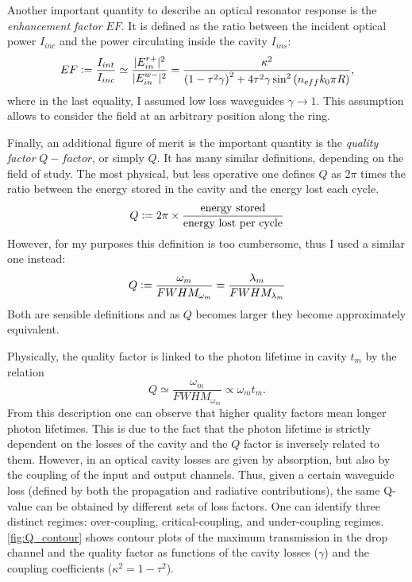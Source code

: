 Another important quantity to describe an optical resonator response is the \textit{enhancement factor} $EF$.
It is defined as the ratio between the incident optical power $I_{inc}$ and the power circulating inside the cavity $I_{ins}$:
\begin{equation}
EF
	\vcentcolon= \dfrac{I_{int}}{I_{inc}}
	\simeq \dfrac{|E_{in}^{r+}|^2}{|E_{in}^{w-}|^2}
	= \dfrac	{ \kappa^2 } { \left( 1-\tau^2	\gamma \right)^2 + 4 \tau^2	\gamma \sin^2 \left( n_{eff} k_0 \pi R \right) },
	\label{eq:enhancement_factor}
\end{equation}
where in the last equality, I assumed low loss waveguides $\gamma \rightarrow 1$.
This assumption allows to consider the field at an arbitrary position along the ring.

Finally, an additional figure of merit is the important quantity is the \textit{quality factor} $Q-factor$, or simply $Q$.
It has many similar definitions, depending on the field of study.
The most physical, but less operative one defines $Q$ as $2\pi$ times the ratio between the energy stored in the cavity and the energy lost each cycle.
\begin{equation}
	Q \vcentcolon= 2\pi \times \frac{\mathrm{energy~stored}}{\mathrm{energy~lost~per~cycle}}
\end{equation}
However, for my purposes this definition is too cumbersome, thus I used a similar one instead:
\begin{equation}
	Q \vcentcolon= \dfrac{\omega_m}{FWHM_{\omega_m}} = \dfrac{\lambda_m}{FWHM_{\lambda_m}}
\end{equation}
Both are sensible definitions and as $Q$ becomes larger they become approximately equivalent.

Physically, the quality factor is linked to the photon lifetime in cavity $t_m$ by the relation
\begin{equation}
	Q \simeq \frac{\omega_m}{FWHM_{\omega_m}} \propto \omega_m t_m.
\end{equation}
From this description one can observe that higher quality factors mean longer photon lifetimes.
This is due to the fact that the photon lifetime is strictly dependent on the losses of the cavity and the $Q$ factor is inversely related to them.
However, in an optical cavity losses are given by absorption, but also by the coupling of the input and output channels.
Thus, given a certain waveguide loss (defined by both the propagation and radiative contributions), the same Q-value can be obtained by different sets of loss factors.
One can identify three distinct regimes: over-coupling, critical-coupling, and under-coupling regimes.
\autoref{fig:Q_contour} shows contour plots of the maximum transmission in the drop channel and the quality factor as functions of the cavity losses ($\gamma$) and the coupling coefficients ($\kappa^2=1-\tau^2$).

